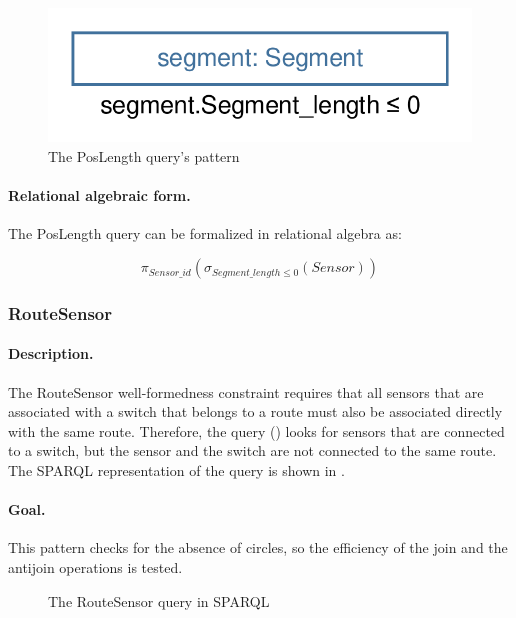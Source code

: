 \begin{figure}[Htb]
		\centering
		\includegraphics[scale=0.4]{figures/trainbenchmark-poslength}
		\caption{The \textsf{PosLength} query's pattern}
		\label{fig:trainbenchmark-poslength}
\end{figure}

\paragraph{Relational algebraic form.} The \textsf{PosLength} query can be formalized in relational algebra as:

$$ \pi_{\mathit{Sensor\_id}} \left( \sigma_{\mathit{Segment\_length} \leq 0} \left( \mathit{Sensor} \right) \right) $$

\subsubsection{RouteSensor}

\paragraph{Description.} The \textsf{RouteSensor} well-formedness constraint requires that all sensors that are associated with a switch that belongs to a route must also be associated directly with the same route. Therefore, the query () looks for sensors that are connected to a switch, but the sensor and the switch are not connected to the same route. The SPARQL representation of the query is shown in .

\paragraph{Goal.} This pattern checks for the absence of circles, so the efficiency of the join and the antijoin operations is tested.

\begin{figure}[Htb]
\centering
\begin{minipage}{0.6\textwidth}
  { \alignListing
    }
  \caption{The \textsf{RouteSensor} query in SPARQL}
  \label{lst:routesensor-sparql-nac}
\end{minipage}
\end{figure}

